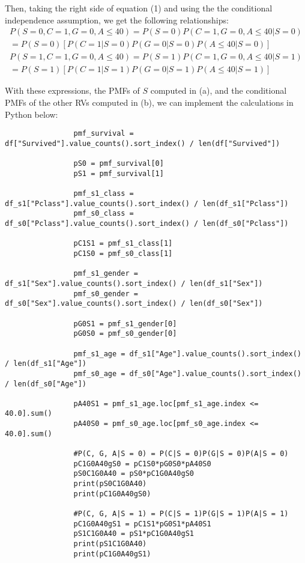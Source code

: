 \documentclass[]{article}
\begin{document}
\begin{enumerate}
\begin{enumerate}
    		Then, taking the right side of equation (1) and using the the conditional independence assumption, we get the following relationships:
       		\begin{multline}
    			P(S=0,C=1,G=0,A\leq40) = P(S=0)P(C=1,G=0,A\leq40|S=0) \\
    			= P(S=0)[P(C=1|S=0)P(G=0|S=0)P(A\leq40|S=0)]
    		\end{multline}
    		\begin{multline}
    			P(S=1,C=1,G=0,A\leq40) = P(S=1)P(C=1,G=0,A\leq40|S=1) \\
    			= P(S=1)[P(C=1|S=1)P(G=0|S=1)P(A\leq40|S=1)]
    		\end{multline}
    	
    		With these expressions, the PMFs of $S$ computed in (a), and the conditional PMFs of the other RVs computed in (b), we can implement the calculations in Python below:
    		
    		\begin{lstlisting}
    			pmf_survival = df["Survived"].value_counts().sort_index() / len(df["Survived"])
    			
    			pS0 = pmf_survival[0]
    			pS1 = pmf_survival[1]
    			
    			pmf_s1_class = df_s1["Pclass"].value_counts().sort_index() / len(df_s1["Pclass"])
    			pmf_s0_class = df_s0["Pclass"].value_counts().sort_index() / len(df_s0["Pclass"])
    			
    			pC1S1 = pmf_s1_class[1]
    			pC1S0 = pmf_s0_class[1]
    			
    			pmf_s1_gender = df_s1["Sex"].value_counts().sort_index() / len(df_s1["Sex"])
    			pmf_s0_gender = df_s0["Sex"].value_counts().sort_index() / len(df_s0["Sex"])
    			
    			pG0S1 = pmf_s1_gender[0]
    			pG0S0 = pmf_s0_gender[0]
    			
    			pmf_s1_age = df_s1["Age"].value_counts().sort_index() / len(df_s1["Age"])
    			pmf_s0_age = df_s0["Age"].value_counts().sort_index() / len(df_s0["Age"])
    			
    			pA40S1 = pmf_s1_age.loc[pmf_s1_age.index <= 40.0].sum()
    			pA40S0 = pmf_s0_age.loc[pmf_s0_age.index <= 40.0].sum()
    			
    			#P(C, G, A|S = 0) = P(C|S = 0)P(G|S = 0)P(A|S = 0)
    			pC1G0A40gS0 = pC1S0*pG0S0*pA40S0
    			pS0C1G0A40 = pS0*pC1G0A40gS0
    			print(pS0C1G0A40)
    			print(pC1G0A40gS0)
    			
    			#P(C, G, A|S = 1) = P(C|S = 1)P(G|S = 1)P(A|S = 1)
    			pC1G0A40gS1 = pC1S1*pG0S1*pA40S1
    			pS1C1G0A40 = pS1*pC1G0A40gS1
    			print(pS1C1G0A40)
    			print(pC1G0A40gS1)
    			

\end{lstlisting}
\end{enumerate}
\end{enumerate}
\end{document}
